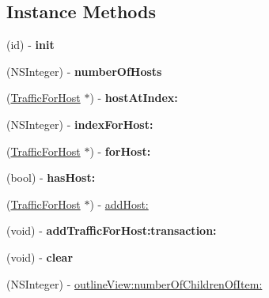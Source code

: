 \subsection*{Instance Methods}
\begin{DoxyCompactItemize}
\item 
\mbox{\label{interface_captured_traffic_acdd5b72302022b9be357560878784ea9}} 
(id) -\/ {\bfseries init}
\item 
\mbox{\label{interface_captured_traffic_a3da8260e570235ac807c02de279467f2}} 
(N\+S\+Integer) -\/ {\bfseries number\+Of\+Hosts}
\item 
\mbox{\label{interface_captured_traffic_a1f8959e9fd8fe8815db3ed69e146ef88}} 
(\hyperlink{interface_traffic_for_host}{Traffic\+For\+Host} $\ast$) -\/ {\bfseries host\+At\+Index\+:}
\item 
\mbox{\label{interface_captured_traffic_afe61d80050dddc768880b712efa5d6d1}} 
(N\+S\+Integer) -\/ {\bfseries index\+For\+Host\+:}
\item 
\mbox{\label{interface_captured_traffic_aebedaa145f8a2ad119043f046d10fda1}} 
(\hyperlink{interface_traffic_for_host}{Traffic\+For\+Host} $\ast$) -\/ {\bfseries for\+Host\+:}
\item 
\mbox{\label{interface_captured_traffic_a6d2a57254bf7543f3693870027802c36}} 
(bool) -\/ {\bfseries has\+Host\+:}
\item 
(\hyperlink{interface_traffic_for_host}{Traffic\+For\+Host} $\ast$) -\/ \hyperlink{interface_captured_traffic_a134d3585d95975a5067d01602bed36bb}{add\+Host\+:}
\item 
\mbox{\label{interface_captured_traffic_afe6d2922f5e3b1815b3bbaaed3afdc47}} 
(void) -\/ {\bfseries add\+Traffic\+For\+Host\+:transaction\+:}
\item 
\mbox{\label{interface_captured_traffic_ad392586d3ba46d237c82bbbbc5be1f1e}} 
(void) -\/ {\bfseries clear}
\item 
(N\+S\+Integer) -\/ \hyperlink{interface_captured_traffic_a0acba96e0a2c8ffacfbb79fa7da8966b}{outline\+View\+:number\+Of\+Children\+Of\+Item\+:}

\end{DoxyCompactItemize}
